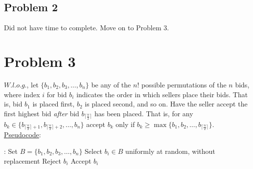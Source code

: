 \documentclass[twoside,11pt]{homework}
\newcommand\NoProc{\renewcommand\algorithmicprocedure{}}
\begin{document}
\subsection*{Problem 2}

Did not have time to complete. Move on to Problem 3.

%
%
%


%
%
%
%





\section*{Problem 3}
$W.l.o.g.$, let $\{b_1, b_2, b_3, \dots, b_n\}$ be any of the $n!$ possible permutations of the $n$ bids, where index $i$ for bid $b_i$ indicates the order in which sellers place their bids. That is, bid $b_1$ is placed first, $b_2$ is placed second, and so on. 
Have the seller accept the first highest bid \textit{after} bid $b_{\lceil \frac{n}{2} \rceil}$ has been placed.  That is,  for any $b_k \in \{b_{\lceil \frac{n}{2} \rceil+1},  b_{\lceil \frac{n}{2} \rceil+2}, \dots, b_n\}$ accept $b_k$ only if $b_k \geq \max\{b_1, b_2, \dots, b_{\lceil \frac{n}{2} \rceil}\}$.   \\

\noindent
\underline{Pseudocode}:
\begin{algorithm}
\begin{algorithmic}[1]
\NoProc
{}:  
\State Set $B = \{b_1, b_2, b_3, \dots, b_n\}$
\State Select $b_i \in B$ uniformly at random, without replacement
\State Reject $b_i$
\State Accept $b_i$
\EndIf
\EndIf
\EndFor
\EndProcedure 
\end{algorithmic}
\end{algorithm}
\end{document}
